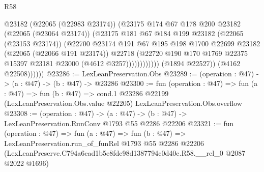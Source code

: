 \begin{lexlean}{R58}
\begin{coremodule}
                              @23182
                              (@22065 (@22983 @23174))
                              (@23175
                                @174
                                @67
                                @178
                                @200
                                @23182
                                (@22065 (@23064 @23174))
                                (@23175
                                  @181
                                  @67
                                  @184
                                  @199
                                  @23182
                                  (@22065 (@23153 @23174))
                                  (@22700
                                    @23174
                                    @191
                                    @67
                                    @195
                                    @198
                                    @1700
                                    @22699
                                    @23182
                                    (@22065 (@22066 @191 @23174))
                                    @22718
                                    (@22720
                                      @190
                                      @170
                                      @1769
                                      @22375
                                      @15397
                                      @23181
                                      @23000
                                      (@4612 @3257))))))))))))
                (@1894 @22527))
              (@4162 @22508))))))
@23286 := LexLeanPreservation.Obs
@23289 := (operation : @47) -> (a : @47) -> (b : @47) -> @23286
@23300 := fun (operation : @47) =>
  fun (a : @47) =>
  fun (b : @47) =>
  cond.{1} @23286 @22199 (LexLeanPreservation.Obs.value @22205) LexLeanPreservation.Obs.overflow
@23308 := (operation : @47) ->
  (a : @47) -> (b : @47) -> LexLeanPreservation.RunConv @1793 @55 @2286 @22206
@23321 := fun (operation : @47) =>
  fun (a : @47) =>
  fun (b : @47) =>
  LexLeanPreservation.run_of_funRel
    @1793
    @55
    @2286
    @22206
    (LexLeanPreserve.C794a6cad1b5e8fdc98d1387794c0d40c.R58.__rel_0 @2087 @2022 @1696)
\end{coremodule}
\end{lexlean}
